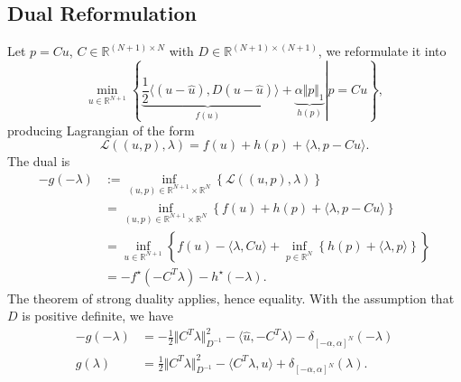 \documentclass[]{article}
\theoremstyle{definition}
\numberwithin{equation}{subsection}
\begin{document}
    \subsection*{Dual Reformulation}
        Let $p = Cu$, $C\in \mathbb R^{(N + 1)\times N}$ with $D \in \mathbb R^{(N + 1)\times (N + 1)}$, we reformulate it into 
        \[
            \min_{u\in \mathbb R^{N + 1}}     
            \left\lbrace
                \left.
                    \underbrace{\frac{1}{2}\langle (u - \hat u), D(u - \hat u)}_{f(u)}\rangle 
                    + 
                    \underbrace{\alpha \Vert p\Vert_1}_{h(p)}
                \right| 
                p = Cu
            \right\rbrace, 
        \]
        producing Lagrangian of the form 
        \[
            \mathcal L((u, p), \lambda) = 
            f(u) + h(p) + \langle \lambda, p - Cu\rangle. 
        \]
        The dual is
        \begin{align*}
            - g(-\lambda) &:= \inf_{(u, p)\in \mathbb R^{N + 1}\times \mathbb R^N}
            \left\lbrace
                \mathcal L({(u, p), \lambda})
            \right\rbrace
            \\
            &= \inf_{(u, p)\in \mathbb R^{N + 1}\times \mathbb R^N}
            \left\lbrace
                f(u) + h(p) + \langle \lambda, p - Cu\rangle
            \right\rbrace
            \\
            &= 
            \inf_{u\in \mathbb R^{N + 1}}
            \left\lbrace
                f(u) - \langle \lambda, Cu\rangle 
                + 
                \inf_{p\in \mathbb R^{N}}
                \left\lbrace
                    h(p) + \langle \lambda, p\rangle  
                \right\rbrace
            \right\rbrace
            \\
            &=
            -f^\star (-C^T\lambda) - h^\star(-\lambda). 
        \end{align*}
        The theorem of strong duality applies, hence equality. 
        With the assumption that $D$ is positive definite, we have 
        \begin{align*}
            - g(-\lambda) &= -\frac{1}{2}   \Vert C^T\lambda\Vert^2_{D^{-1}} - 
            \langle \hat u, - C^T \lambda\rangle - 
            \delta_{[-\alpha, \alpha]^N}(-\lambda)
            \\
            g(\lambda) &= \frac{1}{2} \Vert C^T\lambda\Vert_{D^{-1}}^2 - 
            \langle C^T\lambda, u\rangle + \delta_{[-\alpha, \alpha]^N}(\lambda). 
        \end{align*}
\end{document}
